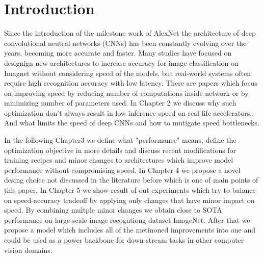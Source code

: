 

\chapter{Introduction}







Since the introduction of the milestone work of AlexNet \cite{alexnet??} the architecture of deep convolutional neutral networks (CNNs) has been constantly evolving over the years, becoming more accurate and faster. Many studies have focused on designign new architectures to increase accuracy for image classification on Imagnet without considering speed of the models, but real-world systems often require high recognition accuracy with low latency. There are papers which focus on improving speed by reducing number of computations inside network or by minimizing number of parameters used. In Chapter 2 we discuss why such optimization don't always result in low inference speed on real-life accelerators. And what limits the speed of deep CNNs and how to mutigate speed bottlenecks.

In the following Chapter3 we define what "performance" means, define the optimization objective in more details and discuss recent modifications for training recipes and minor changes to architectures which improve model performance without compromising speed. In Chapter 4 we propose a novel desing choice not discussed in the literature before which is one of main points of this paper. In Chapter 5 we show result of out experiments which try to balance on speed-accuracy tradeoff by applying only changes that have minor impact on speed. By combining multple minor changes we obtain close to SOTA performance on large-scale image recogntiong dataset ImageNet. After that we propose a model which includes all of the metinoned improvements into one and could be used as a power backbone for down-stream tasks in other computer vision domains.

